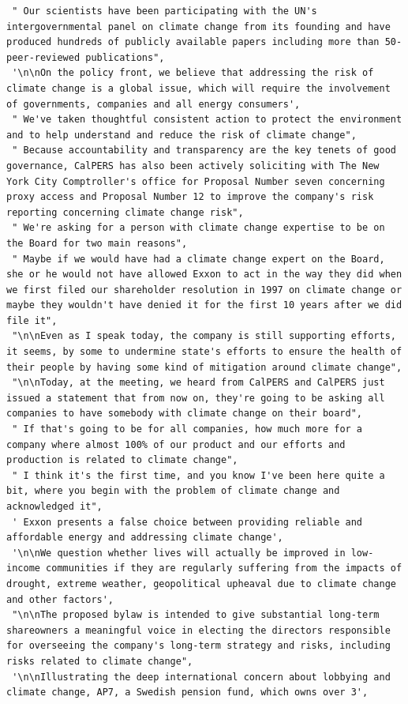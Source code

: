 \documentclass[
  letterpaper,
  DIV=11,
  numbers=noendperiod]{scrreprt}
\begin{document}
\begin{verbatim}
 " Our scientists have been participating with the UN's intergovernmental panel on climate change from its founding and have produced hundreds of publicly available papers including more than 50-peer-reviewed publications",
 '\n\nOn the policy front, we believe that addressing the risk of climate change is a global issue, which will require the involvement of governments, companies and all energy consumers',
 " We've taken thoughtful consistent action to protect the environment and to help understand and reduce the risk of climate change",
 " Because accountability and transparency are the key tenets of good governance, CalPERS has also been actively soliciting with The New York City Comptroller's office for Proposal Number seven concerning proxy access and Proposal Number 12 to improve the company's risk reporting concerning climate change risk",
 " We're asking for a person with climate change expertise to be on the Board for two main reasons",
 " Maybe if we would have had a climate change expert on the Board, she or he would not have allowed Exxon to act in the way they did when we first filed our shareholder resolution in 1997 on climate change or maybe they wouldn't have denied it for the first 10 years after we did file it",
 "\n\nEven as I speak today, the company is still supporting efforts, it seems, by some to undermine state's efforts to ensure the health of their people by having some kind of mitigation around climate change",
 "\n\nToday, at the meeting, we heard from CalPERS and CalPERS just issued a statement that from now on, they're going to be asking all companies to have somebody with climate change on their board",
 " If that's going to be for all companies, how much more for a company where almost 100% of our product and our efforts and production is related to climate change",
 " I think it's the first time, and you know I've been here quite a bit, where you begin with the problem of climate change and acknowledged it",
 ' Exxon presents a false choice between providing reliable and affordable energy and addressing climate change',
 '\n\nWe question whether lives will actually be improved in low-income communities if they are regularly suffering from the impacts of drought, extreme weather, geopolitical upheaval due to climate change and other factors',
 "\n\nThe proposed bylaw is intended to give substantial long-term shareowners a meaningful voice in electing the directors responsible for overseeing the company's long-term strategy and risks, including risks related to climate change",
 '\n\nIllustrating the deep international concern about lobbying and climate change, AP7, a Swedish pension fund, which owns over 3',

\end{verbatim}
\end{document}
